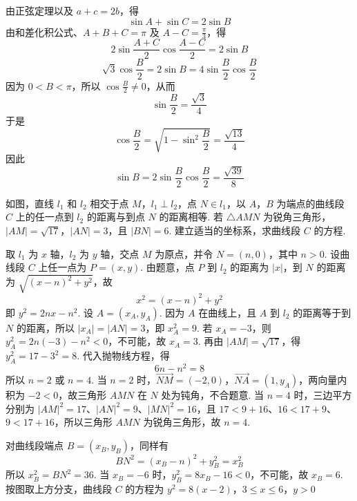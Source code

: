 \documentclass[UTF8,a4paper,oneside,11pt]{ctexbook}
\begin{document}
\begin{solution}
由正弦定理以及 \(a+c=2b\)，得
\[
\sin A+\sin C=2\sin B
\]
由和差化积公式、\(A+B+C=\pi\) 及 \(A-C=\frac{\pi}{3}\)，得
\[
2\sin\frac{A+C}{2}\cos\frac{A-C}{2}=2\sin B
\]
\[
\sqrt{3}\cos\frac{B}{2}=2\sin B=4\sin\frac{B}{2}\cos\frac{B}{2}
\]
因为 \(0<B<\pi\)，所以 \(\cos\frac{B}{2}\ne0\)，从而
\[
\sin\frac{B}{2}=\frac{\sqrt{3}}{4}
\]
于是
\[
\cos\frac{B}{2}=\sqrt{1-\sin^{2}\frac{B}{2}}=\frac{\sqrt{13}}{4}
\]
因此
\[
\sin B=2\sin\frac{B}{2}\cos\frac{B}{2}=\frac{\sqrt{39}}{8}
\]
\end{solution}

\begin{problem}
如图，直线 \(l_{1}\) 和 \(l_{2}\) 相交于点 \(M\)，\(l_{1} \perp l_{2}\)，点 \(N \in l_{1}\)，以 \(A\)，\(B\) 为端点的曲线段 \(C\) 上的任一点到 \(l_{2}\) 的距离与到点 \(N\) 的距离相等. 若 \(\triangle AMN\) 为锐角三角形，\(|AM| = \sqrt{17}\)，\(|AN| = 3\)，且 \(|BN| = 6\). 建立适当的坐标系，求曲线段 \(C\) 的方程.

\end{problem}

\begin{solution}
取 \(l_{1}\) 为 \(x\) 轴，\(l_{2}\) 为 \(y\) 轴，交点 \(M\) 为原点，并令 \(N=(n,0)\)，其中 \(n>0\). 设曲线段 \(C\) 上任一点为 \(P=(x,y)\). 由题意，点 \(P\) 到 \(l_{2}\) 的距离为 \(\lvert x\rvert\)，到 \(N\) 的距离为 \(\sqrt{(x-n)^{2}+y^{2}}\)，故
\[
x^{2}=(x-n)^{2}+y^{2}
\]
即 \(y^{2}=2nx-n^{2}\).
设 \(A=(x_{A},y_{A})\). 因为 \(A\) 在曲线上，且 \(A\) 到 \(l_{2}\) 的距离等于到 \(N\) 的距离，所以 \(\lvert x_{A}\rvert=\lvert AN\rvert=3\)，即 \(x_{A}^{2}=9\). 若 \(x_{A}=-3\)，则 \(y_{A}^{2}=2n(-3)-n^{2}<0\)，不可能，故 \(x_{A}=3\). 再由 \(\lvert AM\rvert=\sqrt{17}\)，得 \(y_{A}^{2}=17-3^{2}=8\). 代入抛物线方程，得
\[
6n-n^{2}=8
\]
所以 \(n=2\) 或 \(n=4\). 当 \(n=2\) 时，\(\overrightarrow{NM}=(-2,0)\)，\(\overrightarrow{NA}=(1,y_{A})\)，两向量内积为 \(-2<0\)，故三角形 \(AMN\) 在 \(N\) 处为钝角，不合题意. 当 \(n=4\) 时，三边平方分别为
\(|AM|^{2}=17\)、\(|AN|^{2}=9\)、\(|MN|^{2}=16\)，且 \(17<9+16\)、\(16<17+9\)、\(9<17+16\)，所以三角形 \(AMN\) 为锐角三角形，故 \(n=4\).

对曲线段端点 \(B=(x_{B},y_{B})\)，同样有
\[
BN^{2}=(x_{B}-n)^{2}+y_{B}^{2}=x_{B}^{2}
\]
所以 \(x_{B}^{2}=BN^{2}=36\). 当 \(x_{B}=-6\) 时，\(y_{B}^{2}=8x_{B}-16<0\)，不可能，故 \(x_{B}=6\). 按图取上方分支，曲线段 \(C\) 的方程为
\(y^{2}=8(x-2)\)，\(3\leq x\leq6\)，\(y>0\)
\end{solution}
\end{document}
